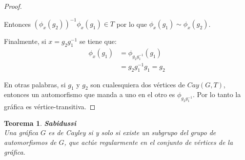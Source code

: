\documentclass[12pt]{book}
\newtheorem{theorem}{Teorema}
\theoremstyle{definition}
\begin{document}
\begin{proof}
\begin{enumerate}
Entonces $(\phi_x(g_2))^{-1}\phi_x(g_1)\in T$ por lo que $\phi_x(g_1)
\sim \phi_x(g_2)$.

\end{enumerate}

Finalmente, si $x=g_2g_1^{-1}$ se tiene que: 
\begin{equation*}
  \begin{split}
    \phi_x(g_1)&=\phi_{g_2g_1^{-1}}(g_1)\\
    &=g_2g_1^{-1}g_1=g_2
  \end{split}
\end{equation*}

En otras palabras, si $g_1$ y $g_2$ son cualesquiera dos vértices de $Cay(G,T)$,
entonces un automorfismo que manda a uno en el otro es
$\phi_{g_{2}g_1^{-1}}$. Por lo tanto la gráfica es vértice-transitiva.  
\end{proof}


\begin{theorem}\textbf{Sabidussi}\\
Una gráfica $G$ es de Cayley si y solo si existe un subgrupo del
grupo de automorfismos de $G$, que actúe regularmente en el conjunto
de vértices de la gráfica.
\end{theorem}
\end{document}
